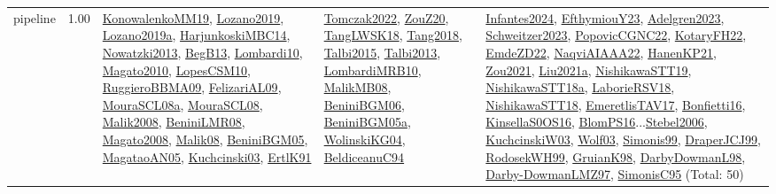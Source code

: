 {\begin{longtable}{p{3cm}r>{\raggedright\arraybackslash}p{6cm}>{\raggedright\arraybackslash}p{6cm}>{\raggedright\arraybackslash}p{8cm}}
\index{pipeline}\index{ApplicationAreas!pipeline}pipeline &  1.00 & \hyperref[detail:KonowalenkoMM19]{KonowalenkoMM19}, \hyperref[detail:Lozano2019]{Lozano2019}, \hyperref[detail:Lozano2019a]{Lozano2019a}, \hyperref[detail:HarjunkoskiMBC14]{HarjunkoskiMBC14}, \hyperref[detail:Nowatzki2013]{Nowatzki2013}, \hyperref[detail:BegB13]{BegB13}, \hyperref[detail:Lombardi10]{Lombardi10}, \hyperref[detail:Magato2010]{Magato2010}, \hyperref[detail:LopesCSM10]{LopesCSM10}, \hyperref[detail:RuggieroBBMA09]{RuggieroBBMA09}, \hyperref[detail:FelizariAL09]{FelizariAL09}, \hyperref[detail:MouraSCL08a]{MouraSCL08a}, \hyperref[detail:MouraSCL08]{MouraSCL08}, \hyperref[detail:Malik2008]{Malik2008}, \hyperref[detail:BeniniLMR08]{BeniniLMR08}, \hyperref[detail:Magato2008]{Magato2008}, \hyperref[detail:Malik08]{Malik08}, \hyperref[detail:BeniniBGM05]{BeniniBGM05}, \hyperref[detail:MagataoAN05]{MagataoAN05}, \hyperref[detail:Kuchcinski03]{Kuchcinski03}, \hyperref[detail:ErtlK91]{ErtlK91} & \hyperref[detail:Tomczak2022]{Tomczak2022}, \hyperref[detail:ZouZ20]{ZouZ20}, \hyperref[detail:TangLWSK18]{TangLWSK18}, \hyperref[detail:Tang2018]{Tang2018}, \hyperref[detail:Talbi2015]{Talbi2015}, \hyperref[detail:Talbi2013]{Talbi2013}, \hyperref[detail:LombardiMRB10]{LombardiMRB10}, \hyperref[detail:MalikMB08]{MalikMB08}, \hyperref[detail:BeniniBGM06]{BeniniBGM06}, \hyperref[detail:BeniniBGM05a]{BeniniBGM05a}, \hyperref[detail:WolinskiKG04]{WolinskiKG04}, \hyperref[detail:BeldiceanuC94]{BeldiceanuC94} & \hyperref[detail:Infantes2024]{Infantes2024}, \hyperref[detail:EfthymiouY23]{EfthymiouY23}, \hyperref[detail:Adelgren2023]{Adelgren2023}, \hyperref[detail:Schweitzer2023]{Schweitzer2023}, \hyperref[detail:PopovicCGNC22]{PopovicCGNC22}, \hyperref[detail:KotaryFH22]{KotaryFH22}, \hyperref[detail:EmdeZD22]{EmdeZD22}, \hyperref[detail:NaqviAIAAA22]{NaqviAIAAA22}, \hyperref[detail:HanenKP21]{HanenKP21}, \hyperref[detail:Zou2021]{Zou2021}, \hyperref[detail:Liu2021a]{Liu2021a}, \hyperref[detail:NishikawaSTT19]{NishikawaSTT19}, \hyperref[detail:NishikawaSTT18a]{NishikawaSTT18a}, \hyperref[detail:LaborieRSV18]{LaborieRSV18}, \hyperref[detail:NishikawaSTT18]{NishikawaSTT18}, \hyperref[detail:EmeretlisTAV17]{EmeretlisTAV17}, \hyperref[detail:Bonfietti16]{Bonfietti16}, \hyperref[detail:KinsellaS0OS16]{KinsellaS0OS16}, \hyperref[detail:BlomPS16]{BlomPS16}...\hyperref[detail:Stebel2006]{Stebel2006}, \hyperref[detail:KuchcinskiW03]{KuchcinskiW03}, \hyperref[detail:Wolf03]{Wolf03}, \hyperref[detail:Simonis99]{Simonis99}, \hyperref[detail:DraperJCJ99]{DraperJCJ99}, \hyperref[detail:RodosekWH99]{RodosekWH99}, \hyperref[detail:GruianK98]{GruianK98}, \hyperref[detail:DarbyDowmanL98]{DarbyDowmanL98}, \hyperref[detail:Darby-DowmanLMZ97]{Darby-DowmanLMZ97}, \hyperref[detail:SimonisC95]{SimonisC95} (Total: 50)\\

\end{longtable}}
